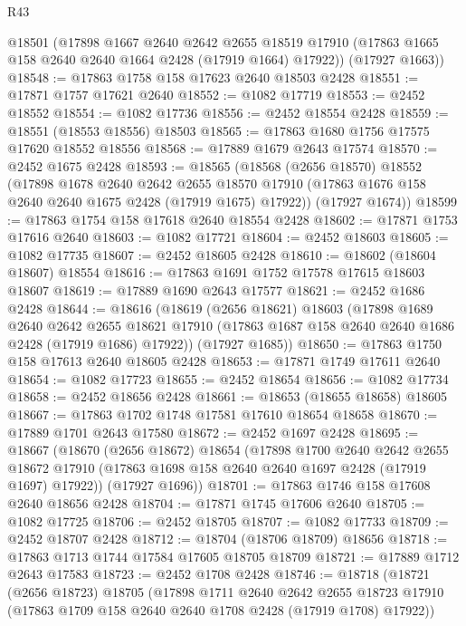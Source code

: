 \begin{lexlean}{R43}
\begin{coremodule}
      @18501
      (@17898
        @1667
        @2640
        @2642
        @2655
        @18519
        @17910
        (@17863 @1665 @158 @2640 @2640 @1664 @2428 (@17919 @1664) @17922))
      (@17927 @1663))
@18548 := @17863 @1758 @158 @17623 @2640 @18503 @2428
@18551 := @17871 @1757 @17621 @2640
@18552 := @1082 @17719
@18553 := @2452 @18552
@18554 := @1082 @17736
@18556 := @2452 @18554 @2428
@18559 := @18551 (@18553 @18556) @18503
@18565 := @17863 @1680 @1756 @17575 @17620 @18552 @18556
@18568 := @17889 @1679 @2643 @17574
@18570 := @2452 @1675 @2428
@18593 := @18565
    (@18568
      (@2656 @18570)
      @18552
      (@17898
        @1678
        @2640
        @2642
        @2655
        @18570
        @17910
        (@17863 @1676 @158 @2640 @2640 @1675 @2428 (@17919 @1675) @17922))
      (@17927 @1674))
@18599 := @17863 @1754 @158 @17618 @2640 @18554 @2428
@18602 := @17871 @1753 @17616 @2640
@18603 := @1082 @17721
@18604 := @2452 @18603
@18605 := @1082 @17735
@18607 := @2452 @18605 @2428
@18610 := @18602 (@18604 @18607) @18554
@18616 := @17863 @1691 @1752 @17578 @17615 @18603 @18607
@18619 := @17889 @1690 @2643 @17577
@18621 := @2452 @1686 @2428
@18644 := @18616
    (@18619
      (@2656 @18621)
      @18603
      (@17898
        @1689
        @2640
        @2642
        @2655
        @18621
        @17910
        (@17863 @1687 @158 @2640 @2640 @1686 @2428 (@17919 @1686) @17922))
      (@17927 @1685))
@18650 := @17863 @1750 @158 @17613 @2640 @18605 @2428
@18653 := @17871 @1749 @17611 @2640
@18654 := @1082 @17723
@18655 := @2452 @18654
@18656 := @1082 @17734
@18658 := @2452 @18656 @2428
@18661 := @18653 (@18655 @18658) @18605
@18667 := @17863 @1702 @1748 @17581 @17610 @18654 @18658
@18670 := @17889 @1701 @2643 @17580
@18672 := @2452 @1697 @2428
@18695 := @18667
    (@18670
      (@2656 @18672)
      @18654
      (@17898
        @1700
        @2640
        @2642
        @2655
        @18672
        @17910
        (@17863 @1698 @158 @2640 @2640 @1697 @2428 (@17919 @1697) @17922))
      (@17927 @1696))
@18701 := @17863 @1746 @158 @17608 @2640 @18656 @2428
@18704 := @17871 @1745 @17606 @2640
@18705 := @1082 @17725
@18706 := @2452 @18705
@18707 := @1082 @17733
@18709 := @2452 @18707 @2428
@18712 := @18704 (@18706 @18709) @18656
@18718 := @17863 @1713 @1744 @17584 @17605 @18705 @18709
@18721 := @17889 @1712 @2643 @17583
@18723 := @2452 @1708 @2428
@18746 := @18718
    (@18721
      (@2656 @18723)
      @18705
      (@17898
        @1711
        @2640
        @2642
        @2655
        @18723
        @17910
        (@17863 @1709 @158 @2640 @2640 @1708 @2428 (@17919 @1708) @17922))

\end{coremodule}
\end{lexlean}
